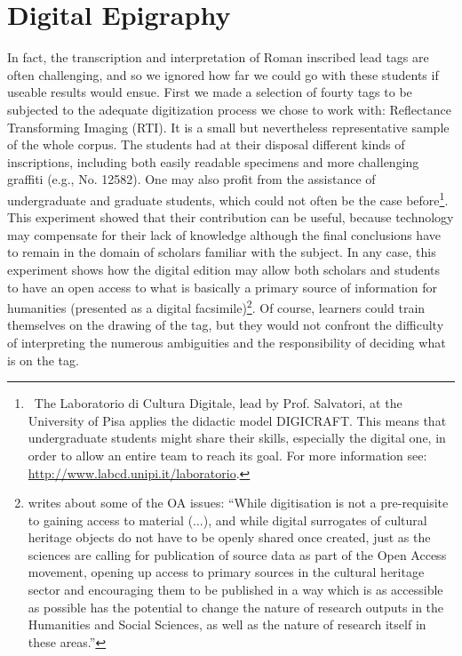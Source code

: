 \documentclass[amsthm,ebook]{saparticle}
\begin{document}
\section{Digital Epigraphy}


\noindent In fact, the transcription and interpretation of Roman inscribed lead tags are often challenging, and so we ignored how
far we could go with these students if useable results would ensue. First we made a selection of fourty tags to be
subjected to the adequate digitization process we chose to work with: Reflectance Transforming Imaging (RTI). It is a
small but nevertheless representative sample of the whole corpus. The students had at their disposal different kinds of
inscriptions, including both easily readable specimens and more challenging graffiti (e.g., No. 12582). One may also
profit from the assistance of undergraduate and graduate students, which could not often be the case
before\footnote{\ The Laboratorio di Cultura Digitale, lead by Prof. Salvatori, at the University of Pisa applies the
didactic model DIGICRAFT. This means that undergraduate students might share their skills, especially the digital one,
in order to allow an entire team to reach its goal. For more information see: \url{http://www.labcd.unipi.it/laboratorio}.}.
This experiment showed that their contribution can be useful, because technology may compensate for their lack of
knowledge although the final conclusions have to remain in the domain of scholars familiar with the subject. In any
case, this experiment shows how the digital edition may allow both scholars and students to have an open access to what
is basically a primary source of information for humanities (presented as a digital facsimile)\footnote{\citet{gorman_opening_2015}
writes about some of the OA issues: ``While digitisation is not a pre-requisite to gaining access to material (...), and
while digital surrogates of cultural heritage objects do not have to be openly shared once created, just as the
sciences are calling for publication of source data as part of the Open Access movement, opening up access to primary
sources in the cultural heritage sector and encouraging them to be published in a way which is as accessible as
possible has the potential to change the nature of research outputs in the Humanities and Social Sciences, as well as
the nature of research itself in these areas.''}. Of course, learners could train themselves on the drawing of the tag,
but they would not confront the difficulty of interpreting the numerous ambiguities and the responsibility of deciding
what is on the tag. 
\end{document}
